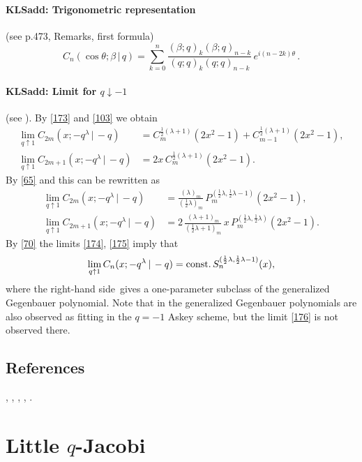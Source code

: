 \documentclass[envcountchap,graybox]{svmono}
\newcommand\be\beta
\newcommand\tha\theta
\newcommand\la\lambda
\newcommand\half{\frac12}
\newcommand\const{{\rm const.}\,}
\newcommand\RHS{right-hand side}
\begin{document}
\paragraph{\large\bf KLSadd: Trigonometric representation}(see p.473, Remarks, first formula)
\begin{equation}
C_n(\cos\tha;\be\,|\, q)=\sum_{k=0}^n
\frac{(\be;q)_k (\be;q)_{n-k}}{(q;q)_k (q;q)_{n-k}}\,e^{i(n-2k)\tha}\,.
\label{173}
\end{equation}
%
\paragraph{\large\bf KLSadd: Limit for $q\downarrow-1$}(see ).
By \eqref{173} and \eqref{103} we obtain
\begin{align*}
\lim_{q\uparrow1} C_{2m}(x;-q^\la\,|\,-q)&=
C_m^{\half(\la+1)}(2x^2-1)+C_{m-1}^{\half(\la+1)}(2x^2-1),\\
\lim_{q\uparrow1} C_{2m+1}(x;-q^\la\,|\,-q)&=
2x\,C_m^{\half(\la+1)}(2x^2-1).
\end{align*}
By \eqref{65} and  this can be rewritten as
\begin{align}
\lim_{q\uparrow1} C_{2m}(x;-q^\la\,|\,-q)&=
\frac{(\la)_m}{(\half\la)_m}\, P_m^{(\half\la,\half\la-1)}(2x^2-1),
\label{174}\\
\lim_{q\uparrow1} C_{2m+1}(x;-q^\la\,|\,-q)&=
2\,\frac{(\la+1)_m}{(\half\la+1)_m}\,x\,P_m^{(\half\la,\half\la)}(2x^2-1).
\label{175}
\end{align}
By \eqref{70} the limits \eqref{174}, \eqref{175} imply that
\begin{equation}
\lim_{q\uparrow1} C_n(x;-q^\la\,|\,-q)
=\const S_n^{(\half\la,\half\la-1)}(x),
\label{176}
\end{equation}
where the \RHS\ gives a one-parameter subclass of the
generalized Gegenbauer polynomial. Note that in
\cite[Section 7.1]{K28} the generalized Gegenbauer polynomials are
also observed as fitting in the $q=-1$ Askey scheme, but the limit
\eqref{176} is not observed there.
%

\subsection*{References}
\cite{AlSalam90}, \cite{AlSalamVerma88}, \cite{AtakAtakKlimyk}, \cite{DattaGriffin},
\cite{IsmailLibis}.


\section{Little $q$-Jacobi}
\par\setcounter{equation}{0}
\end{document}
